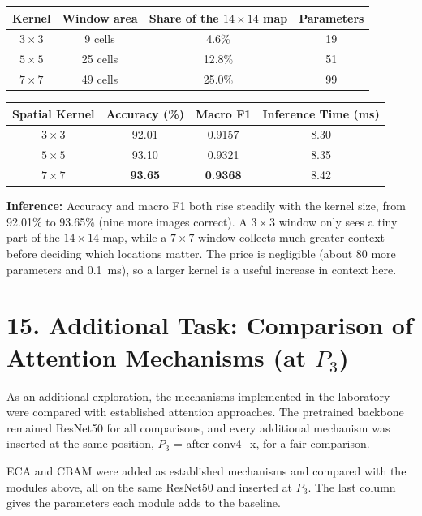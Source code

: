 \documentclass[11pt]{article}
\begin{document}
\begin{center}
\small
\begin{tabular}{|c|c|c|c|}
\hline
Kernel & Window area & Share of the $14\times14$ map & Parameters\\
\hline
$3\times3$ & 9 cells & 4.6\% & 19\\
$5\times5$ & 25 cells & 12.8\% & 51\\
$7\times7$ & 49 cells & 25.0\% & 99\\
\hline
\end{tabular}
\end{center}

\begin{center}
\begin{tabular}{|c|c|c|c|}
\hline
Spatial Kernel & Accuracy (\%) & Macro F1 & Inference Time (ms)\\
\hline
$3\times3$ & 92.01 & 0.9157 & 8.30\\
$5\times5$ & 93.10 & 0.9321 & 8.35\\
$7\times7$ & \textbf{93.65} & \textbf{0.9368} & 8.42\\
\hline
\end{tabular}
\end{center}

\textbf{Inference:} Accuracy and macro F1 both rise steadily with the
kernel size, from 92.01\% to 93.65\% (nine more images correct). A
$3\times3$ window only sees a tiny part of the $14\times14$ map, while a
$7\times7$ window collects much greater context before deciding which
locations matter. The price is negligible (about 80 more parameters and
0.1~ms), so a larger kernel is a useful increase in context here.

\section*{15. Additional Task: Comparison of Attention Mechanisms (at $P_3$)}

As an additional exploration, the mechanisms implemented in the laboratory
were compared with established attention approaches. The pretrained
backbone remained ResNet50 for all comparisons, and every additional
mechanism was inserted at the same position, $P_3$ = after conv4\_x, for a
fair comparison.

ECA and CBAM were added as established mechanisms and compared with the
modules above, all on the same ResNet50 and inserted at $P_3$. The last
column gives the parameters each module adds to the baseline.
\end{document}
